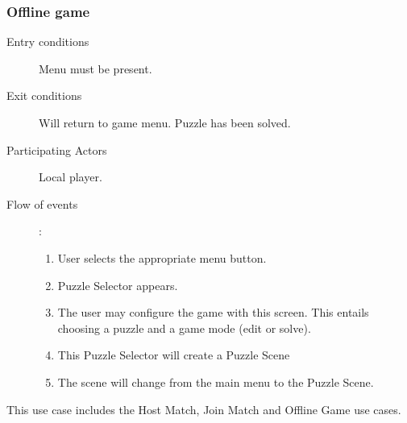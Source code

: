 \documentclass[12pt]{article}
\begin{document}
    \subsubsection{Offline game}
    \begin{description}
        \item[Entry conditions] Menu must be present.
        \item[Exit conditions] Will return to game menu. Puzzle has been
            solved.
        \item[Participating Actors] Local player.
        \item[Flow of events]:
            \begin{enumerate}
                \item User selects the appropriate menu button.
                \item Puzzle Selector appears.
                \item The user may configure the game with this screen. This
                    entails choosing a puzzle and a game mode (edit or solve).
                \item This Puzzle Selector will create a Puzzle Scene
                \item The scene will change from the main menu to the Puzzle
                    Scene.
            \end{enumerate}
    \end{description}


    This use case includes the Host Match, Join Match and Offline Game
    use cases.
\end{document}
